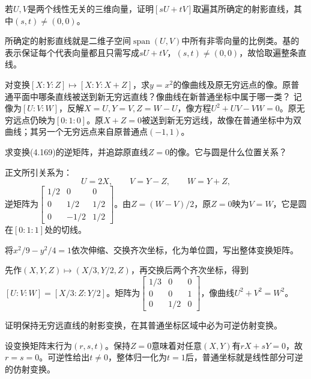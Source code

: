 若\(U,V\)是两个线性无关的三维向量，证明\([sU+tV]\)取遍其所确定的射影直线，其中\((s,t)\ne(0,0)\)。
\par
\solutionanswer
所确定的射影直线就是二维子空间\(\operatorname{span}(U,V)\)中所有非零向量的比例类。基的表示保证每个代表向量都且只需写成\(sU+tV\)，\((s,t)\ne(0,0)\)，故恰取遍整条直线。


对变换\([X:Y:Z]\mapsto[X:Y:X+Z]\)，求\(y=x^2\)的像曲线及原无穷远点的像。原普通平面中哪条直线被送到新无穷远直线？像曲线在新普通坐标中属于哪一类？
\solutionanswer
记像为\([U:V:W]\)，反解\(X=U,Y=V,Z=W-U\)，像方程\(U^2+UV-VW=0\)。原无穷远点仍映为\([0:1:0]\)。原\(X+Z=0\)被送到新无穷远线，故像在普通坐标中为双曲线；其另一个无穷远点来自原普通点\((-1,1)\)。


求变换\textup{(4.169)}的逆矩阵，并追踪原直线\(Z=0\)的像。它与圆是什么位置关系？
\par

\par\smallskip\noindent 正文所引关系为：
\begin{equation*}
U=2X,\qquad V=Y-Z,\qquad W=Y+Z,
\end{equation*}
\solutionanswer
逆矩阵为\(\begin{bmatrix}1/2&0&0\\0&1/2&1/2\\0&-1/2&1/2\end{bmatrix}\)。由\(Z=(W-V)/2\)，原\(Z=0\)映为\(V=W\)，它是圆在\([0:1:1]\)处的切线。


将\(x^2/9-y^2/4=1\)依次伸缩、交换齐次坐标，化为单位圆，写出整体变换矩阵。
\par
\solutionanswer
先作\((X,Y,Z)\mapsto(X/3,Y/2,Z)\)，再交换后两个齐次坐标，得到\([U:V:W]=[X/3:Z:Y/2]\)。矩阵为\(\begin{bmatrix}1/3&0&0\\0&0&1\\0&1/2&0\end{bmatrix}\)，像曲线\(U^2+V^2=W^2\)。


证明保持无穷远直线的射影变换，在其普通坐标区域中必为可逆仿射变换。
\par
\solutionanswer
设变换矩阵末行为\((r,s,t)\)。保持\(Z=0\)意味着对任意\((X,Y)\)有\(rX+sY=0\)，故\(r=s=0\)。可逆性给出\(t\ne0\)，整体归一化为\(t=1\)后，普通坐标就是线性部分可逆的仿射变换。


